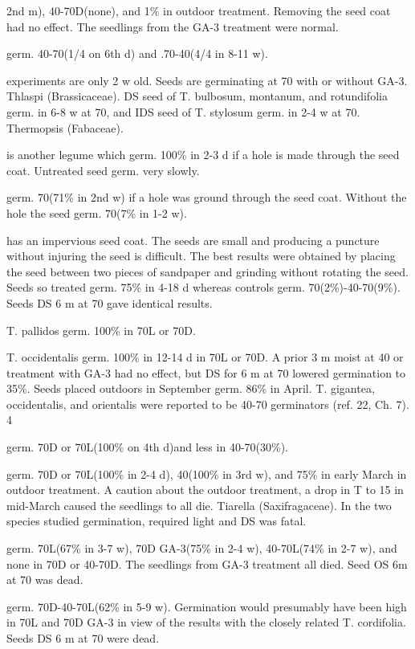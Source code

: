 \begin{description}
2nd m), 40-70D(none), and 1\% in outdoor treatment. Removing the seed coat had no
effect. The seedlings from the GA-3 treatment were normal.
\item[T. tuberosum] germ. 40-70(1/4 on 6th d) and .70-40(4/4 in 8-11 w).
\item[T. tuchiyamai] experiments are only 2 w old. Seeds are germinating at 70 with or
without GA-3.
Thlaspi (Brassicaceae). DS seed of T. bulbosum, montanum, and
rotundifolia germ. in 6-8 w at 70, and IDS seed of T. stylosum germ. in 2-4 w at 70.
Thermopsis (Fabaceae).
\item[T. alpina] is another legume which germ. 100\% in 2-3 d if a hole is made
through the seed coat. Untreated seed germ. very slowly.
\item[T. alternifolia] germ. 70(71\% in 2nd w) if a hole was ground through the seed
coat. Without the hole the seed germ. 70(7\% in 1-2 w).
\item[T. caroliniana] has an impervious seed coat. The seeds are small and
producing a puncture without injuring the seed is difficult. The best results were
obtained by placing the seed between two pieces of sandpaper and grinding without
rotating the seed. Seeds so treated germ. 75\% in 4-18 d whereas controls germ.
70(2\%)-40-70(9\%). Seeds DS 6 m at 70 gave identical results.

\item[Theropogori (Lilliaceae)] T. pallidos germ. 100\% in 70L or 70D.
\item[Thuja (Pinaceae)] T. occidentalis germ. 100\% in 12-14 d in 70L or 70D. A
prior 3 m moist at 40 or treatment with GA-3 had no effect, but DS for 6 m at 70 lowered
germination to 35\%. Seeds placed outdoors in September germ. 86\% in April. T.
gigantea, occidentalis, and orientalis were reported to be 40-70 germinators (ref. 22,
Ch. 7). 4

\item[Thymus (Lamlaceae)]
\item[T. incertus] germ. 70D or 70L(100\% on 4th d)and less in 40-70(30\%).
\item[T. vulgare] germ. 70D or 70L(100\% in 2-4 d), 40(100\% in 3rd w), and 75\% in
early March in outdoor treatment. A caution about the outdoor treatment, a drop in T to
15 in mid-March caused the seedlings to all die.
Tiarella (Saxifragaceae). In the two species studied germination, required
light and DS was fatal.

\item[T. cordifolia] germ. 70L(67\% in 3-7 w), 70D GA-3(75\% in 2-4 w), 40-70L(74\% in
2-7 w), and none in 70D or 40-70D. The seedlings from GA-3 treatment all died. Seed
OS 6m at 70 was dead.
\item[T. wherryi] germ. 70D-40-70L(62\% in 5-9 w). Germination would presumably
have been high in 70L and 70D GA-3 in view of the results with the closely related T.
cordifolia. Seeds DS 6 m at 70 were dead.


\end{description}
